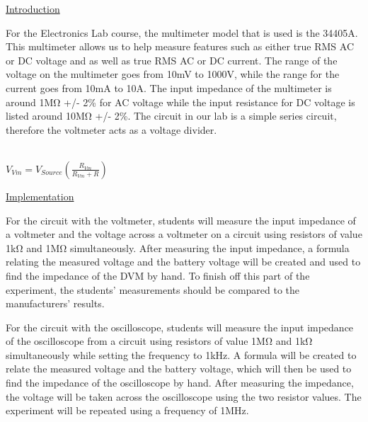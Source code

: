 \documentclass[a4paper,10pt]{article}
\begin{document}
\underline{Introduction}

For the Electronics Lab course, the multimeter model that is used is the 34405A. This multimeter allows us to help measure features such as either true RMS AC or DC voltage and as well as true RMS AC or DC current. The range of the voltage on the multimeter goes from 10mV to 1000V, while the range for the current goes from 10mA to 10A. The input impedance of the multimeter is around 1M\si{\ohm} +/- 2\% for AC voltage while the input resistance for DC voltage is listed around 10M\si{\ohm} +/- 2\%. The circuit in our lab is a simple series circuit, therefore the voltmeter acts as a voltage divider.\\
\\
\centerline{ $ V_{Vm} = V_{Source}(\frac{R_{Vm}}{R_{Vm} + R}) $}

\underline{Implementation}

For the circuit with the voltmeter, students will measure the input impedance of a voltmeter and the voltage across a voltmeter on a circuit using resistors of value 1kΩ and 1MΩ simultaneously. After measuring the input impedance, a formula relating the measured voltage and the battery voltage will be created and used to find the impedance of the DVM by hand. To finish off this part of the experiment, the students’ measurements should be compared to the manufacturers’ results. 


For the circuit with the oscilloscope, students will measure the input impedance of the oscilloscope from a circuit using resistors of value 1MΩ and 1kΩ simultaneously while setting the frequency to 1kHz. A formula will be created to relate the measured voltage and the battery voltage, which will then be used to find the impedance of the oscilloscope by hand. After measuring the impedance, the voltage will be taken across the oscilloscope using the two resistor values. The experiment will be repeated using a frequency of 1MHz.
\end{document}
